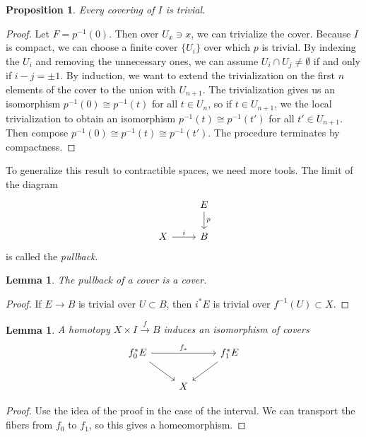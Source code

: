 \documentclass[leqno, openany]{memoir}
\newtheorem{prop}[thm]{Proposition}
\newtheorem{lem}[thm]{Lemma}
\theoremstyle{definition}
\theoremstyle{remark}
\theoremstyle{plain}
\theoremstyle{definition}
\theoremstyle{remark}
\begin{document}
\begin{prop}
    Every covering of $I$ is trivial.
\end{prop}

\begin{proof}
    Let $F = p^{-1}(0)$. Then over $U_x \ni x$, we can trivialize the cover. Because $I$ is compact, we can choose a finite cover $\{ U_i\}$ over which $p$ is trivial. By indexing the $U_i$ and removing the unnecessary ones, we can assume $U_i \cap U_j \neq \emptyset$ if and only if $i - j = \pm 1$. By induction, we want to extend the trivialization on the first $n$ elements of the cover to the union with $U_{n+1}$. The trivialization gives us an isomorphism $p^{-1}(0) \cong p^{-1}(t)$ for all $t \in U_n$, so if $t \in U_{n+1}$, we the local trivialization to obtain an isomorphism $p^{-1}(t) \cong p^{-1}(t')$ for all $t' \in U_{n+1}$. Then compose $p^{-1}(0) \cong p^{-1}(t) \cong p^{-1}(t')$. The procedure terminates by compactness.
\end{proof}

To generalize this result to contractible spaces, we need more tools. The limit of the diagram
\begin{equation}
\begin{tikzcd}
    & E \arrow{d}{p} \\
    X \arrow{r}{i} & B
\end{tikzcd}
\end{equation}
is called the \textit{pullback}. 

\begin{lem}
    The pullback of a cover is a cover.
\end{lem}

\begin{proof}
    If $E \to B$ is trivial over $U \subset B$, then $i^* E$ is trivial over $f^{-1}(U) \subset X$.
\end{proof}

\begin{lem}
    A homotopy $X \times I \xrightarrow{f} B$ induces an isomorphism of covers
    \begin{equation}
    \begin{tikzcd}
        f_0^* E \arrow{rr}{f_*} \arrow{dr} & & f_1^* E \arrow{dl} \\
                                           & X &
    \end{tikzcd}
    \end{equation}
\end{lem}

\begin{proof}
    Use the idea of the proof in the case of the interval. We can transport the fibers from $f_0$ to $f_1$, so this gives a homeomorphism.
\end{proof}
\end{document}
